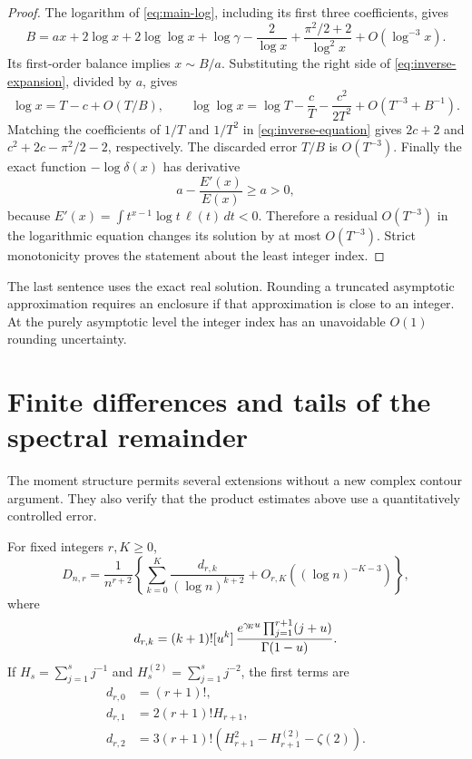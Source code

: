 \begin{proof}
The logarithm of \eqref{eq:main-log}, including its first three
coefficients, gives
\begin{equation}\label{eq:inverse-equation}
 B=ax+2\log x+2\log\log x+\log\gamma
       -\frac2{\log x}
       +\frac{\pi^2/2+2}{\log^2x}
       +O(\log^{-3}x).
\end{equation}
Its first-order balance implies $x\sim B/a$. Substituting the
right side of \eqref{eq:inverse-expansion}, divided by $a$, gives
\[
 \log x=T-c+O(T/B),\qquad
 \log\log x=\log T-\frac cT-\frac{c^2}{2T^2}
                 +O(T^{-3}+B^{-1}).
\]
Matching the coefficients of $1/T$ and $1/T^2$ in
\eqref{eq:inverse-equation} gives $2c+2$ and
$c^2+2c-\pi^2/2-2$, respectively. The discarded error $T/B$ is
$O(T^{-3})$. Finally the exact function
$-\log\delta(x)$ has derivative
\[
 a-\frac{E'(x)}{E(x)}\ge a>0,
\]
because $E'(x)=\int t^{x-1}\log t\,\ell(t)\,dt<0$.
Therefore a residual $O(T^{-3})$ in the logarithmic equation changes
its solution by at most $O(T^{-3})$. Strict monotonicity proves the
statement about the least integer index.
\end{proof}

The last sentence uses the exact real solution. Rounding a truncated
asymptotic approximation requires an enclosure if that approximation
is close to an integer. At the purely asymptotic level the integer
index has an unavoidable $O(1)$ rounding uncertainty.

\section{Finite differences and tails of the spectral remainder}
\label{sec:additional-consequences}

The moment structure permits several extensions without a new complex
contour argument. They also verify that the product estimates above
use a quantitatively controlled error.

\begin{proposition}
\label{prop:difference-asymptotic}
For fixed integers $r,K\ge0$,
\begin{equation}\label{eq:difference-asymptotic}
 D_{n,r}=\frac1{n^{r+2}}\left\{
   \sum_{k=0}^K\frac{d_{r,k}}{(\log n)^{k+2}}
             +O_{r,K}((\log n)^{-K-3})\right\},
\end{equation}
where
\begin{equation}\label{eq:difference-coefficients}
 d_{r,k}=(k+1)![u^k]\,
       \frac{e^{\gamma_{\!E} u}\prod_{j=1}^{r+1}(j+u)}{\Gamma(1-u)}.
\end{equation}
If $H_s=\sum_{j=1}^s j^{-1}$ and
$H_s^{(2)}=\sum_{j=1}^s j^{-2}$, the first terms are
\begin{align}\label{eq:difference-first}
 d_{r,0}&=(r+1)!,\nonumber\\
 d_{r,1}&=2(r+1)!H_{r+1},\nonumber\\
 d_{r,2}&=3(r+1)!\left(H_{r+1}^2-H_{r+1}^{(2)}-\zeta(2)\right).
\end{align}
\end{proposition}

